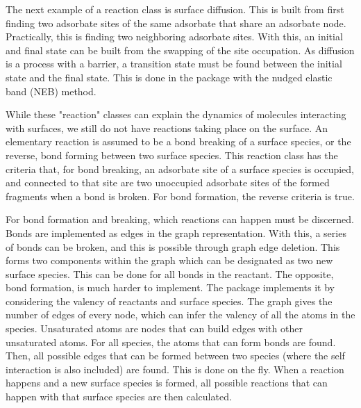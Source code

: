 \documentclass[journal=jacsat,manuscript=article]{achemso}
\begin{document}
The next example of a reaction class is surface diffusion.
This is built from first finding two adsorbate sites of the same adsorbate that share an adsorbate node.
Practically, this is finding two neighboring adsorbate sites.
With this, an initial and final state can be built from the swapping of the site occupation.
As diffusion is a process with a barrier, a transition state must be found between the initial state and the final state.
This is done in the package with the nudged elastic band (NEB) method.

While these "reaction" classes can explain the dynamics of molecules interacting with surfaces, we still do not have reactions taking place on the surface.
An elementary reaction is assumed to be a bond breaking of a surface species, or the reverse, bond forming between two surface species.
This reaction class has the criteria that, for bond breaking, an adsorbate site of a surface species is occupied, and connected to that site are two unoccupied adsorbate sites of the formed fragments when a bond is broken.
For bond formation, the reverse criteria is true.

For bond formation and breaking, which reactions can happen must be discerned.
Bonds are implemented as edges in the graph representation.
With this, a series of bonds can be broken, and this is possible through graph edge deletion.
This forms two components within the graph which can be designated as two new surface species.
This can be done for all bonds in the reactant.
The opposite, bond formation, is much harder to implement.
The package implements it by considering the valency of reactants and surface species.
The graph gives the number of edges of every node, which can infer the valency of all the atoms in the species.
Unsaturated atoms are nodes that can build edges with other unsaturated atoms.
For all species, the atoms that can form bonds are found.
Then, all possible edges that can be formed between two species (where the self interaction is also included) are found.
This is done on the fly.
When a reaction happens and a new surface species is formed, all possible reactions that can happen with that surface species are then calculated.




%


\begin{acknowledgement}
\end{acknowledgement}

\begin{suppinfo}
\end{suppinfo}


\end{document}
